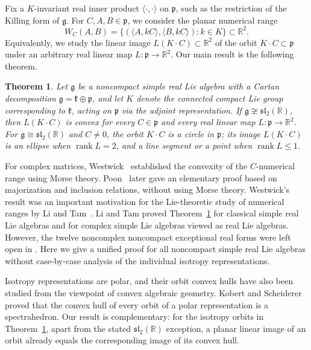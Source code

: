 \documentclass[11pt,reqno]{amsart}
\newtheorem{mainthm}{Theorem}
\theoremstyle{remark}
\newcommand{\R}{\mathbb R}
\newcommand{\gfr}{\mathfrak g}
\newcommand{\kfr}{\mathfrak k}
\newcommand{\pfr}{\mathfrak p}
\begin{document}
Fix a $K$-invariant real inner product $\langle\cdot,\cdot\rangle$ on
$\pfr$, such as the restriction of the Killing form of $\gfr$. For
$C,A,B\in\pfr$, we consider the planar numerical range
\[
 W_C(A,B)=\{(\langle A,kC\rangle,\langle B,kC\rangle):k\in K\}
 \subset\R^2.
\]
Equivalently, we study the linear image $L(K\cdot C)\subset\R^2$ of the
orbit $K\cdot C\subset\pfr$ under an arbitrary real linear map
$L:\pfr\to\R^2$. Our main result is the following theorem.

\begin{mainthm}\label{conv-main}
Let $\gfr$ be a noncompact simple real Lie algebra with a Cartan
decomposition $\gfr=\kfr\oplus\pfr$, and let $K$ denote the connected
compact Lie group corresponding to $\kfr$, acting on $\pfr$ via the
adjoint representation. If $\gfr\not\cong\mathfrak{sl}_2(\R)$, then
$L(K\cdot C)$ is convex for every $C\in\pfr$ and every real linear map
$L:\pfr\to\R^2$. For $\gfr\cong\mathfrak{sl}_2(\R)$ and $C\ne0$,
the orbit $K\cdot C$ is a circle in $\pfr$; its image $L(K\cdot C)$ is
an ellipse when $\operatorname{rank}L=2$, and a line segment or
a point when $\operatorname{rank}L\le1$.
\end{mainthm}

For complex matrices, Westwick~\cite{Westwick1975} established the
convexity of the $C$-numerical range using Morse theory. Poon~\cite{Poon1980}
later gave an elementary proof based on majorization and inclusion
relations, without using Morse theory. Westwick's result was an important
motivation for the Lie-theoretic study of numerical ranges by Li and
Tam~\cite{LiTam2000}. Li and Tam proved Theorem~\ref{conv-main} for
classical simple real Lie algebras and for complex simple Lie algebras
viewed as real Lie algebras. However, the twelve noncomplex noncompact
exceptional real forms were left open in
\cite[Remark~12.1, page~169]{LiTam2000}. Here we give a unified proof
for all noncompact simple real Lie algebras without case-by-case
analysis of the individual isotropy representations.

Isotropy representations are polar, and their orbit convex hulls have
also been studied from the viewpoint of convex algebraic geometry.
Kobert and Scheiderer~\cite{KobertScheiderer2022} proved that the convex
hull of every orbit of a polar representation is a spectrahedron. Our
result is complementary: for the isotropy orbits in
Theorem~\ref{conv-main}, apart from the stated
$\mathfrak{sl}_2(\R)$ exception, a planar linear image of an orbit
already equals the corresponding image of its convex hull.
\end{document}

